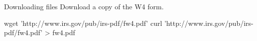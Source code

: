 \begin{block}{Downloading files}
  Download a copy of the W4 form.
  \begin{indented}
    \begin{bashcode}
      wget 'http://www.irs.gov/pub/irs-pdf/fw4.pdf'
      curl 'http://www.irs.gov/pub/irs-pdf/fw4.pdf' > fw4.pdf
    \end{bashcode}
  \end{indented}
\end{block}

